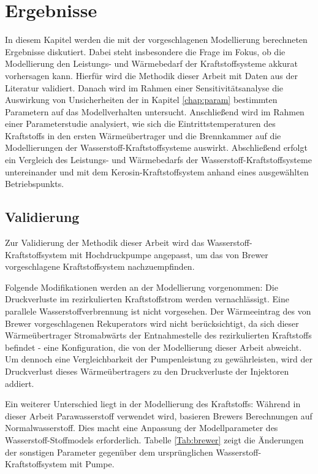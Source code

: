 \chapter{Ergebnisse} \label{chap:ergebnis}

In diesem Kapitel werden die mit der vorgeschlagenen Modellierung berechneten Ergebnisse diskutiert. Dabei steht insbesondere die Frage im Fokus, ob die Modellierung den Leistungs- und Wärmebedarf der Kraftstoffsysteme akkurat vorhersagen kann. Hierfür wird die Methodik dieser Arbeit mit Daten aus der Literatur validiert. Danach wird im Rahmen einer Sensitivitätsanalyse die Auswirkung von Unsicherheiten der in Kapitel \ref{chap:param} bestimmten Parametern auf das Modellverhalten untersucht. Anschließend wird im Rahmen einer Parameterstudie analysiert, wie sich die Eintrittstemperaturen des Kraftstoffs in den ersten Wärmeübertrager und die Brennkammer auf die Modellierungen der Wasserstoff-Kraftstoffsysteme auswirkt. Abschließend erfolgt ein Vergleich des Leistungs- und Wärmebedarfs der Wasserstoff-Kraftstoffsysteme untereinander und mit dem Kerosin-Kraftstoffsystem anhand eines ausgewählten Betriebspunkts.

\section{Validierung}

Zur Validierung der Methodik dieser Arbeit wird das Wasserstoff-Kraftstoffsystem mit Hochdruckpumpe angepasst, um das von Brewer \cite{Brewer.1991} vorgeschlagene Kraftstoffsystem nachzuempfinden. 

Folgende Modifikationen werden an der Modellierung vorgenommen: Die Druckverluste im rezirkulierten Kraftstoffstrom werden vernachlässigt. Eine parallele Wasserstoffverbrennung ist nicht vorgesehen. Der Wärmeeintrag des von Brewer vorgeschlagenen Rekuperators wird nicht berücksichtigt, da sich dieser Wärmeübertrager Stromabwärts der Entnahmestelle des rezirkulierten Kraftstoffs befindet - eine Konfiguration, die von der Modellierung dieser Arbeit abweicht. Um dennoch eine Vergleichbarkeit der Pumpenleistung zu gewährleisten, wird der Druckverlust dieses Wärmeübertragers zu den Druckverluste der Injektoren addiert. 

Ein weiterer Unterschied liegt in der Modellierung des Kraftstoffs: Während in dieser Arbeit Parawasserstoff verwendet wird, basieren Brewers Berechnungen auf Normalwasserstoff. Dies macht eine Anpassung der Modellparameter des Wasserstoff-Stoffmodels erforderlich. Tabelle \ref{Tab:brewer} zeigt die Änderungen der sonstigen Parameter gegenüber dem ursprünglichen Wasserstoff-Kraftstoffsystem mit Pumpe.

